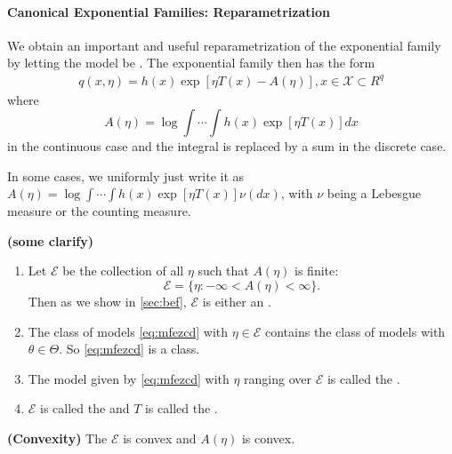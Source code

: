 \documentclass{article}
\newcommand{\bfs}[1]{\textbf{({#1}) }}
\begin{document}
\paragraph{Canonical Exponential Families: Reparametrization}
We obtain an important and useful reparametrization of the exponential family by letting the model be . The exponential family then has the form
\begin{align}
q(x, \eta)=h(x) \exp [\eta T(x)-A(\eta)], x \in \mathcal{X} \subset R^{q}\label{eq:mfezcd}
\end{align}
where $$A(\eta)=\log \int \cdots \int h(x) \exp [\eta T(x)] d x$$ in the continuous case and the integral is replaced by a sum in the discrete case.
\begin{rema}
In some cases, we uniformly just write it as $A(\eta)=\log \int \cdots \int h(x) \exp [\eta T(x)] \nu(d x)$, with $\nu$ being a Lebesgue measure or the counting measure.
\end{rema}
\begin{rema}\bfs{some clarify}

\begin{enumerate}
    \item Let $\mathcal{E}$ be the collection of all $\eta$ such that $A(\eta)$ is finite:
    $$\mathcal{E}=\{\eta: -\infty<A(\eta)<\infty\}.$$ Then as we show in \cref{sec:bef}, $\mathcal{E}$ is either an . 
    \item The class of models \cref{eq:mfezcd} with $\eta \in \mathcal{E}$ contains the class of models with $\theta \in \Theta$. So \cref{eq:mfezcd} is a  class.
    \item The model given by \cref{eq:mfezcd} with $\eta$ ranging over $\mathcal{E}$ is called the .
    \item $\mathcal{E}$ is called the  and $T$ is called the .
\end{enumerate}
\end{rema}  
\begin{lema}\bfs{Convexity}\label{lem:con_onepara}
The  $\mathcal{E}$ is convex and $A(\eta)$ is convex. 
\end{lema}
\end{document}
